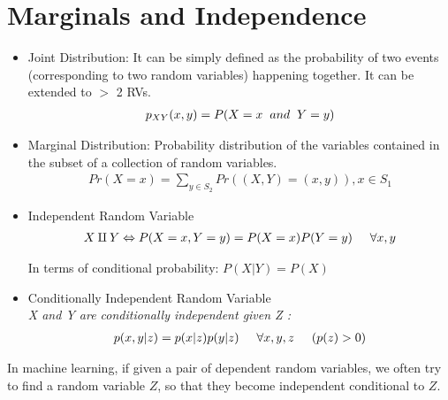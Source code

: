 \documentclass[12pt]{article}
\begin{document}
\section{Marginals and Independence}

\begin{itemize}
\item {Joint Distribution}: 
It can be simply defined as the probability of two events (corresponding to two random variables) happening together. It can be extended to $>$ 2 RVs.
\begin{align*} 
    p_{XY}(x,y)=P(X=x\hspace{0.2cm}and \hspace{0.2cm}Y=y)
\end{align*}

\item Marginal Distribution:  Probability distribution of the variables contained in the subset of a collection of random variables. 
\begin{align*}
    Pr(X=x)=\sum _{y \in S_2}Pr((X,Y)=(x,y)), x \in S_1
\end{align*}
\item Independent Random Variable
\begin{align*}
X \amalg Y \Leftrightarrow P(X=x,Y=y)=P(X=x)P(Y=y)\hspace{0.5cm} \forall x,y
\end{align*}

In terms of conditional probability: \hspace{2pt}
$P(X|Y) = P(X)$

\item Conditionally Independent Random Variable \\
\textit{X and Y are conditionally independent given Z :}
\begin{align*}
p(x,y|z)=p(x|z)p(y|z) \hspace{0.5cm} \forall x,y,z \hspace{0.5cm}(p(z) > 0)
\end{align*}

\end{itemize}


\par In machine learning, if given a pair of dependent random variables, we often try to find a random variable $Z$, so that they become independent conditional to $Z$.
\end{document}
